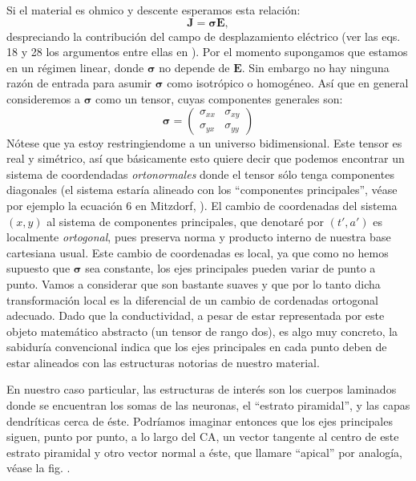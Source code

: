 \documentclass{article}
\newcommand{\Jd}{\mathbf{J}}
\newcommand{\EF}{\mathbf{E}}
\newcommand{\cond}{\boldsymbol{\sigma}}
\begin{document}
Si el material es ohmico y descente esperamos esta relación:
\begin{equation}
\Jd=\cond \EF,
\end{equation}
despreciando la contribución del campo de desplazamiento eléctrico (ver
las eqs. 18 y 28 los argumentos entre ellas en \cite{Bedard11}).
Por el momento supongamos que estamos en un régimen linear, donde
$\cond$ no depende de $\EF$. Sin embargo no hay ninguna razón
de entrada para asumir $\cond$ como isotrópico o homogéneo. Así que en
general consideremos a $\cond$ como un tensor, cuyas componentes generales
son:
\begin{equation}
\cond=\begin{pmatrix}
\sigma_{xx} & \sigma_{xy} \\
\sigma_{yx} & \sigma_{yy}
\end{pmatrix}
\end{equation}
Nótese que ya estoy restringiendome a un universo bidimensional.
Este tensor es real y simétrico, así que básicamente esto quiere decir
que podemos encontrar un sistema de coordendadas \emph{ortonormales}
donde el tensor sólo tenga componentes diagonales (el sistema estaría
alineado con los ``componentes principales'', véase por ejemplo la
ecuación 6 en Mitzdorf,
\cite{Mitzdorf85}). El cambio de coordenadas del sistema $(x,y)$ al
sistema de componentes principales, que denotaré por $(t',a')$ es localmente
\emph{ortogonal}, pues preserva norma y producto interno de nuestra
base cartesiana usual. Este cambio de coordenadas es local, ya que como
no hemos supuesto que $\cond$ sea constante, los ejes principales
pueden variar de punto a punto. Vamos a considerar que son 
bastante suaves y que por lo tanto dicha transformación local es la
diferencial de un cambio de cordenadas ortogonal adecuado.
Dado que la conductividad, a pesar de estar representada por este
objeto matemático abstracto (un tensor de rango dos), es algo muy concreto,
la sabiduría convencional indica que los ejes principales en cada punto
deben de estar alineados con las estructuras notorias de nuestro material.

En nuestro caso particular, las estructuras de interés son los cuerpos laminados
donde se encuentran los somas de las neuronas, el ``estrato piramidal'',
y las capas dendríticas cerca de éste. Podríamos imaginar entonces
que los ejes principales siguen, punto por punto, a lo largo del
CA, un vector tangente al centro de este estrato piramidal y otro vector
normal a éste, que llamare ``apical'' por analogía, véase la fig. 
\cite{esquemas01}.
\end{document}
